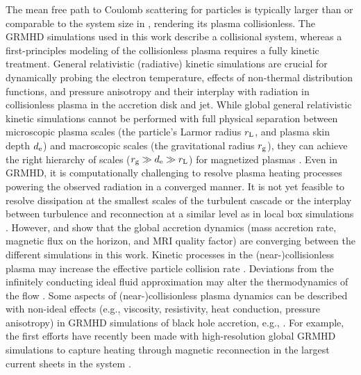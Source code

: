{The mean free path to Coulomb scattering for particles is typically larger than or comparable to the system size in \sgra, rendering its plasma collisionless.
The GRMHD simulations used in this work describe a collisional system, whereas a first-principles modeling of the collisionless plasma requires a fully kinetic treatment.
General relativistic (radiative) kinetic simulations are crucial for dynamically probing the electron temperature, effects of non-thermal distribution functions, and pressure anisotropy and their interplay with radiation in collisionless plasma in the accretion disk and jet.
While global general relativistic kinetic simulations cannot be performed with full physical separation between microscopic plasma scales (the particle's Larmor radius $r_{\rm L}$, and plasma skin depth $d_{\rm e}$) and macroscopic scales (the gravitational radius $r_{\rm g}$), they can achieve the right hierarchy of scales ($r_{\rm g} \gg d_{\rm e} \gg r_{\rm L}$) for magnetized plasmas \citep{2018A&A...616A.184L,2018ApJ...863L..31C,2019PhRvL.122c5101P,2020PhRvL.124n5101C,2020ApJ...895..121C,2020ApJ...902...80K,2021A&A...650A.163C,2021PhRvL.127e5101B}.
Even in GRMHD, it is computationally challenging to resolve plasma heating processes powering the observed radiation in a converged manner.
It is not yet feasible to resolve dissipation at the smallest scales of the turbulent cascade or the interplay between turbulence and reconnection at a similar level as in local box simulations \citep{2012ApJ...755...50R,2013ApJ...773..118H,2015PhRvL.114f1101H,2016PhRvL.117w5101K,2017PhRvL.118e5103Z,2018PhRvL.121y5101C,2018ApJ...859..149I,2019PhRvL.122e5101Z,2021ApJ...921...87N,2021ApJ...923L..13C}.
However, \citet{2019ApJS..243...26P} and \citet[in prep.]{Olivares_et_al} show that the global accretion dynamics (mass accretion rate, magnetic flux on the horizon, and MRI quality factor) are converging between the different simulations in this work.
Kinetic processes in the (near-)collisionless plasma may increase the effective particle collision rate \citep[see, e.g.,][]{2016PhRvL.117w5101K}.
Deviations from the infinitely conducting ideal fluid approximation may alter the thermodynamics of the flow \citep[see, e.g., ][and Appendix~C1]{2017MNRAS.470.2240F}.
Some aspects of (near-)collisionless plasma dynamics can be described with non-ideal effects (e.g., viscosity, resistivity, heat conduction, pressure anisotropy) in GRMHD simulations of black hole accretion, e.g.,  \cite{2014MNRAS.440L..41B,2015ApJ...810..162C,2016MNRAS.456.1332F,2017ApJ...837...92C,2017MNRAS.470.2240F,2018ApJ...859...28Q,2019ApJS..244...10R,2019ApJ...882....2V,2020ApJ...900..100R,2021PhRvD.104j3028M,2021arXiv211103689N,2021arXiv211105752M}.
For example, the first efforts have recently been made with high-resolution global GRMHD simulations to capture heating through magnetic reconnection in the largest current sheets in the system \citep{2020MNRAS.495.1549N,2020ApJ...900..100R,2021MNRAS.508.1241C,2022ApJ...924L..32R,2021arXiv211103689N}.}


